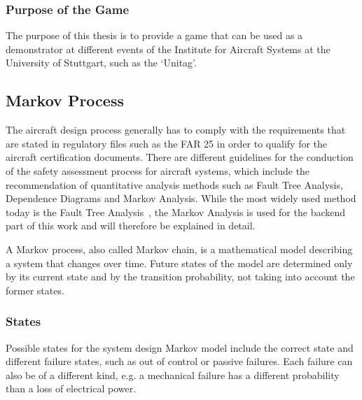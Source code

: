 \subsubsection{Purpose of the Game}\label{subsubsec:purpose}
The purpose of this thesis is to provide a game that can be used as a demonstrator at different events of the Institute for Aircraft
Systems at the University of Stuttgart, such as the `Unitag'.

\subsection{Markov Process}\label{subsec:markov-process}
The aircraft design process generally has to comply with the requirements that are stated in regulatory files such as the FAR 25
in order to qualify for the aircraft certification documents.
There are different guidelines for the conduction of the safety assessment process for aircraft systems, which include the
recommendation of quantitative analysis methods such as Fault Tree Analysis, Dependence Diagrams and Markov Analysis.
While the most widely used method today is the Fault Tree Analysis~\cite{7447967}, the Markov Analysis is used for the backend
part of this work and will therefore be explained in detail.

A Markov process, also called Markov chain, is a mathematical model describing a system that changes over time.
Future states of the model are determined only by its current state and by the transition probability, not taking into account
the former states. 

\subsubsection{States}\label{subsubsec:states}
Possible states for the system design Markov model include the correct state and different failure states, such as out of control
or passive failures.
Each failure can also be of a different kind, e.g. a mechanical failure has a different probability than a loss of electrical power.


